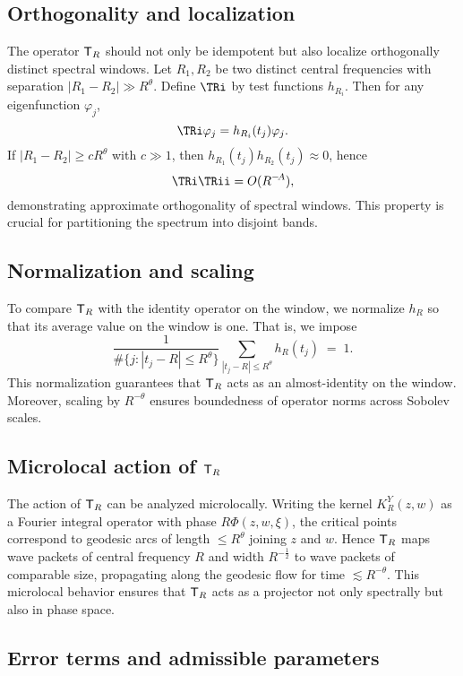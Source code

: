 \subsection{Orthogonality and localization}\label{subsec:proj-orthogonality}

The operator $\mathsf{T}_R$ should not only be idempotent but also localize orthogonally distinct spectral windows. Let $R_1,R_2$ be two distinct central frequencies with separation $|R_1-R_2|\gg R^\theta$. Define $\TRi$ by test functions $h_{R_i}$. Then for any eigenfunction $\varphi_j$,
\[
\TRi\varphi_j = h_{R_i}(t_j)\varphi_j.
\]
If $|R_1-R_2|\ge c R^\theta$ with $c\gg 1$, then $h_{R_1}(t_j)h_{R_2}(t_j)\approx 0$, hence
\[
\TRi\TRii = O(R^{-\!A}),
\]
demonstrating approximate orthogonality of spectral windows. This property is crucial for partitioning the spectrum into disjoint bands.

\subsection{Normalization and scaling}\label{subsec:proj-normalization}

To compare $\mathsf{T}_R$ with the identity operator on the window, we normalize $h_R$ so that its average value on the window is one. That is, we impose
\[
\frac{1}{\#\{j:|t_j-R|\le R^\theta\}} \sum_{|t_j-R|\le R^\theta} h_R(t_j) \;=\; 1.
\]
This normalization guarantees that $\mathsf{T}_R$ acts as an almost-identity on the window. Moreover, scaling by $R^{-\theta}$ ensures boundedness of operator norms across Sobolev scales.

\subsection{Microlocal action of $\mathsf{T}_R$}\label{subsec:proj-micro}

The action of $\mathsf{T}_R$ can be analyzed microlocally. Writing the kernel $K_R^Y(z,w)$ as a Fourier integral operator with phase $R\Phi(z,w,\xi)$, the critical points correspond to geodesic arcs of length $\le R^\theta$ joining $z$ and $w$. Hence $\mathsf{T}_R$ maps wave packets of central frequency $R$ and width $R^{-\tfrac12}$ to wave packets of comparable size, propagating along the geodesic flow for time $\lesssim R^{-\theta}$. This microlocal behavior ensures that $\mathsf{T}_R$ acts as a projector not only spectrally but also in phase space.

\subsection{Error terms and admissible parameters}\label{subsec:proj-errors}

